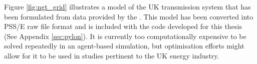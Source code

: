 Figure \ref{fig:ngt_grid} illustrates a model of the UK transmission system that
has been formulated from data provided by the .  This model
has been converted into PSS/E raw file format and is included with the
code developed for this thesis (See Appendix \ref{sec:pylon}).
It is currently too computationally expensive to be solved repeatedly in an
agent-based simulation, but optimisation efforts might allow for it to be used
in studies pertinent to the UK energy industry.

